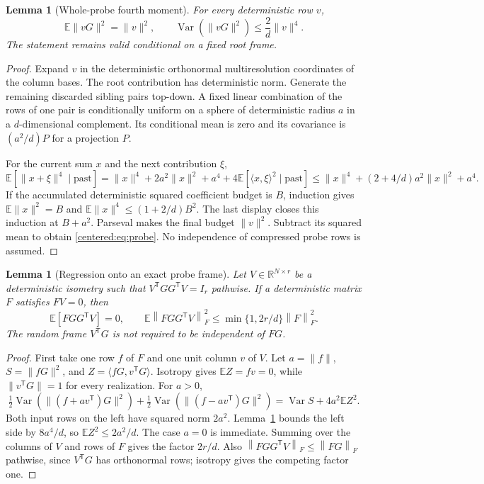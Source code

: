 \documentclass[11pt,oneside,openany,a4paper]{book}
\numberwithin{equation}{chapter}
\newtheorem{lemma}[theorem]{Lemma}
\theoremstyle{definition}
\theoremstyle{remark}
\newcommand{\R}{\mathbb R}\newcommand{\E}{\mathbb E}\newcommand{\Prb}{\mathbb P}\newcommand{\PP}{\mathbb P}
\newcommand{\F}[1]{\left\lVert#1\right\rVert_F}
\begin{document}
\begin{lemma}[Whole-probe fourth moment]\label{centered:lem:probe}
For every deterministic row $v$,
\begin{equation}\label{centered:eq:probe}
 \E\|vG\|^2=\|v\|^2,\qquad
 \operatorname{Var}(\|vG\|^2)\le\frac2d\|v\|^4.
\end{equation}
The statement remains valid conditional on a fixed root frame.
\end{lemma}
\begin{proof}
Expand $v$ in the deterministic orthonormal multiresolution coordinates of the column bases. The root contribution has deterministic norm. Generate the remaining discarded sibling pairs top-down. A fixed linear combination of the rows of one pair is conditionally uniform on a sphere of deterministic radius $a$ in a $d$-dimensional complement. Its conditional mean is zero and its covariance is $(a^2/d)P$ for a projection $P$.

For the current sum $x$ and the next contribution $\xi$,
\[
 \E[\|x+\xi\|^4\mid\text{past}]
 =\|x\|^4+2a^2\|x\|^2+a^4+4\E[\langle x,\xi\rangle^2\mid\text{past}]
 \le\|x\|^4+(2+4/d)a^2\|x\|^2+a^4.
\]
If the accumulated deterministic squared coefficient budget is $B$, induction gives
$\E\|x\|^2=B$ and $\E\|x\|^4\le(1+2/d)B^2$.
The last display closes this induction at $B+a^2$. Parseval makes the final budget $\|v\|^2$. Subtract its squared mean to obtain \eqref{centered:eq:probe}. No independence of compressed probe rows is assumed.
\end{proof}

\begin{lemma}[Regression onto an exact probe frame]\label{centered:lem:regression}
Let $V\in\R^{N\times r}$ be a deterministic isometry such that
$V^{\mathsf T}GG^{\mathsf T}V=I_r$ pathwise. If a deterministic matrix $F$ satisfies $FV=0$, then
\begin{equation}\label{centered:eq:regression}
 \E[FGG^{\mathsf T}V]=0,\qquad
 \boxed{\E\F{FGG^{\mathsf T}V}^2
 \le\min\{1,2r/d\}\F F^2.}
\end{equation}
The random frame $V^{\mathsf T}G$ is not required to be independent of $FG$.
\end{lemma}
\begin{proof}
First take one row $f$ of $F$ and one unit column $v$ of $V$. Let $a=\|f\|$, $S=\|fG\|^2$, and $Z=\langle fG,v^{\mathsf T}G\rangle$. Isotropy gives $\E Z=fv=0$, while $\|v^{\mathsf T}G\|=1$ for every realization. For $a>0$,
\[
 \tfrac12\operatorname{Var}(\|(f+a v^{\mathsf T})G\|^2)
 +\tfrac12\operatorname{Var}(\|(f-a v^{\mathsf T})G\|^2)
 =\operatorname{Var}S+4a^2\E Z^2.
\]
Both input rows on the left have squared norm $2a^2$. Lemma~\ref{centered:lem:probe} bounds the left side by $8a^4/d$, so $\E Z^2\le2a^2/d$. The case $a=0$ is immediate. Summing over the columns of $V$ and rows of $F$ gives the factor $2r/d$. Also $\F{FGG^{\mathsf T}V}\le\F{FG}$ pathwise, since $V^{\mathsf T}G$ has orthonormal rows; isotropy gives the competing factor one.
\end{proof}
\end{document}
